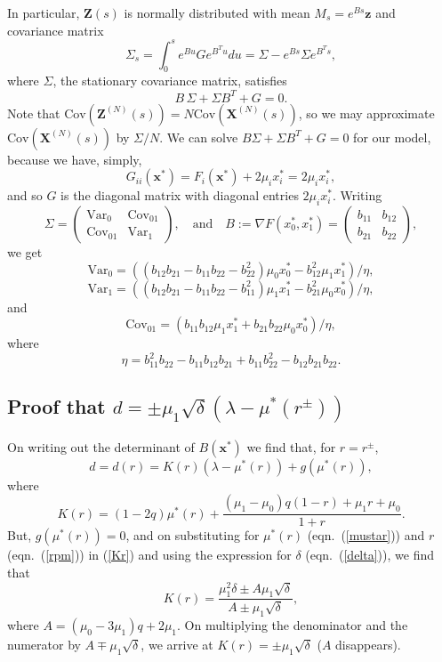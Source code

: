 \documentclass[12pt]{article}
\newcommand{\bz}{\boldsymbol{z}}
\newcommand{\bZ}{\boldsymbol{Z}}
\newcommand{\bXN}{\boldsymbol{X}^{(N)}}
\newcommand{\bZN}{\boldsymbol{Z}^{(N)}}
\newcommand{\Var}{\text{Var}}
\newcommand{\Cov}{\text{Cov}}
\newcommand{\bx}{\boldsymbol{x}}
\begin{document}
\noindent
In particular, $\bZ(s)$ is normally distributed with mean
$M_s=e^{Bs} \bz$ and covariance matrix
$$ 
\Sigma_s =\int_0^s e^{Bu} G e^{B^T u} du =\Sigma-e^{Bs} \Sigma e^{B^T s},
$$
where $\Sigma$, the stationary covariance matrix, satisfies
$$
B\,\Sigma +\Sigma B^T+G=0.
$$
Note that $\Cov(\bZN(s))=N\Cov(\bXN(s))$, so we may approximate
$\Cov(\bXN(s))$ by $\Sigma/N$.
We can solve $B\Sigma +\Sigma B^T+G=0$ for our model, because
we have, simply,
$$
G_{ii}(\bx^*) = F_i(\bx^*)+2\mu_i x_i^*=2\mu_i x_i^*,
$$
and so $G$ is the diagonal matrix with diagonal entries $2\mu_i x_i^*$.
Writing 
$$
\Sigma=
\left(
\begin{matrix}
{\Var}_0 & \Cov_{01} \\
\Cov_{01}     & {\Var}_1
\end{matrix}
\right),
\quad
\text{and}
\quad
B:=\nabla F(x_0^*,x_1^*)=
\left(
\begin{matrix}
b_{11} &b_{12} \\
b_{21} &b_{22}
\end{matrix}
\right),
$$
we get
\begin{equation}
{\Var}_0=
((b_{12}b_{21}-b_{11}b_{22}-b_{22}^2)\mu_0x_0^*-b_{12}^2\mu_1x_1^*)/\eta,
\label{Var0}
\end{equation}
\begin{equation}
{\Var}_1
=((b_{12}b_{21}-b_{11}b_{22}-b_{11}^2)\mu_1x_1^*-b_{21}^2\mu_0x_0^*)/\eta,
\label{Var1}
\end{equation}
and
\begin{equation}
\Cov_{01}
=(b_{11}b_{12}\mu_1x_1^* + b_{21}b_{22}\mu_0x_0^*)/\eta,
\label{Cov}
\end{equation}
where
\begin{equation}
\eta=b_{11}^2b_{22}-b_{11}b_{12}b_{21}+b_{11}b_{22}^2-b_{12}b_{21}b_{22}.
\label{eta}
\end{equation}

\subsection{Proof that $d=\pm\mu_1\sqrt{\delta}(\lambda-\mu^*(r^{\pm}))$}
\label{appendix4}

On writing out the determinant of $B(\bx^*)$ 
we find that, for $r=r^{\pm}$,
$$
d=d(r)=K(r)(\lambda-\mu^*(r)) + g(\mu^*(r)),
$$
where
\begin{equation}
K(r)=(1-2q)\mu^*(r) 
+ \frac{(\mu_1-\mu_0)q(1-r) + \mu_1 r + \mu_0}{1+r}.
\label{Kr}
\end{equation}
But, $g(\mu^*(r))=0$, and
on substituting for $\mu^*(r)$ (eqn.~(\ref{mustar})) and $r$
(eqn.~(\ref{rpm})) in (\ref{Kr})
and using the expression for $\delta$ (eqn.~(\ref{delta})), we find that
$$
K(r)=\frac{\mu_1^2\delta \pm A\mu_1\sqrt{\delta}}{A \pm \mu_1\sqrt{\delta}},
$$
where $A=(\mu_0-3\mu_1)q + 2\mu_1$. On multiplying the denominator and
the numerator by $A \mp \mu_1\sqrt{\delta}$, we arrive at
$K(r)=\pm \mu_1 \sqrt{\delta}$ ($A$ disappears).
\end{document}
